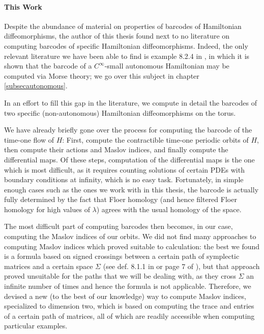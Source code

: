 \paragraph{This Work}

Despite the abundance of material on properties of barcodes of Hamiltonian diffeomorphisms, the author of this thesis found next to no literature on computing barcodes of specific Hamiltonian diffeomorphisms. Indeed, the only relevant literature we have been able to find is example 8.2.4 in \cite{polterovich}, in which it is shown that the barcode of a $C^\infty$-small autonomous Hamiltonian may be computed via Morse theory; we go over this subject in chapter \ref{subsecautonomous}.

In an effort to fill this gap in the literature, we compute in detail the barcodes of two specific (non-autonomous) Hamiltonian diffeomorphisms on the torus.

We have already briefly gone over the process for computing the barcode of the time-one flow of $H$: First, compute the contractible time-one periodic orbits of $H$, then compute their actions and Maslov indices, and finally compute the differential maps. Of these steps, computation of the differential maps is the one which is most difficult, as it requires counting solutions of certain PDEs with boundary conditions at infinity, which is no easy task. Fortunately, in simple enough cases such as the ones we work with in this thesis, the barcode is actually fully determined by the fact that Floer homology (and hence filtered Floer homology for high values of $\lambda$) agrees with the usual homology of the space.

The most difficult part of computing barcodes then becomes, in our case, computing the Maslov indices of our orbits. We did not find many approaches to computing Maslov indices which proved suitable to calculation: the best we found is a formula based on signed crossings between a certain path of symplectic matrices and a certain space $\Sigma$ (see def. 8.1.1 in \cite{polterovich} or page 7 of \cite{robbin1993maslov}), but that approach proved unsuitable for the paths that we will be dealing with, as they cross $\Sigma$ an infinite number of times and hence the formula is not applicable. Therefore, we devised a new (to the best of our knowledge) way to compute Maslov indices, specialized to dimension two, which is based on computing the trace and entries of a certain path of matrices, all of which are readily accessible when computing particular examples.

